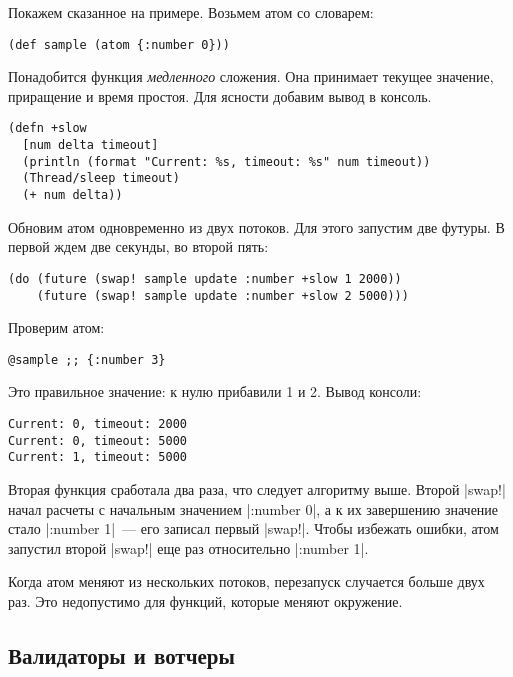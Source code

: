 
Покажем сказанное на примере. Возьмем атом со словарем:

\begin{verbatim}
(def sample (atom {:number 0}))
\end{verbatim}

Понадобится функция \emph{медленного} сложения. Она принимает текущее значение,
приращение и время простоя. Для ясности добавим вывод в консоль.

\begin{verbatim}
(defn +slow
  [num delta timeout]
  (println (format "Current: %s, timeout: %s" num timeout))
  (Thread/sleep timeout)
  (+ num delta))
\end{verbatim}

Обновим атом одновременно из двух потоков. Для этого запустим две футуры. В
первой ждем две секунды, во второй пять:

\begin{verbatim}
(do (future (swap! sample update :number +slow 1 2000))
    (future (swap! sample update :number +slow 2 5000)))
\end{verbatim}

\noindent
Проверим атом:

\begin{verbatim}
@sample ;; {:number 3}
\end{verbatim}

\noindent
Это правильное значение: к нулю прибавили 1 и 2. Вывод консоли:

\begin{verbatim}
Current: 0, timeout: 2000
Current: 0, timeout: 5000
Current: 1, timeout: 5000
\end{verbatim}

Вторая функция сработала два раза, что следует алгоритму выше. Второй
\spverb|swap!| начал расчеты с начальным значением \spverb|{:number 0}|, а к их
завершению значение стало \spverb|{:number 1}|~--- его записал первый
\spverb|swap!|. Чтобы избежать ошибки, атом запустил второй \spverb|swap!| еще
раз относительно \spverb|{:number 1}|.

Когда атом меняют из нескольких потоков, перезапуск случается больше двух
раз. Это недопустимо для функций, которые меняют окружение.

\subsection{Валидаторы и вотчеры}

